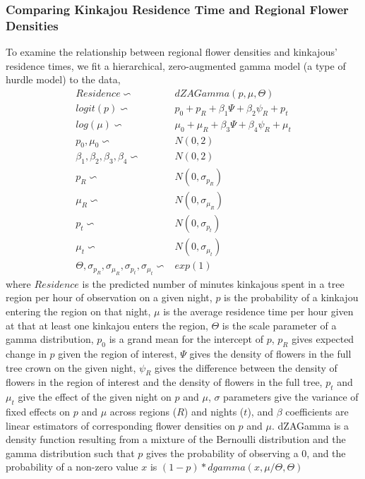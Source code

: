 \documentclass[twoside,12pt,final]{ucthesis-CA2012}
\begin{document}
\begin{ucmainmatter}
\hypertarget{comparing-kinkajou-residence-time-and-regional-flower-densities}{%
\subsubsection{Comparing Kinkajou Residence Time and Regional Flower Densities}\label{comparing-kinkajou-residence-time-and-regional-flower-densities}}

To examine the relationship between regional flower densities and kinkajous' residence times, we fit a hierarchical, zero-augmented gamma model (a type of hurdle model) to the data,
\begin{align*}
Residence \backsim{}& dZAGamma(p, \mu, \Theta) \\
logit(p) \backsim{}& p_0 + p_R + \beta_1 \Psi + \beta_2\psi_R + p_t \\
log(\mu) \backsim{}& \mu_0 + \mu_R + \beta_3 \Psi + \beta_4 \psi_R + \mu_t \\
p_0, \mu_0 \backsim{}& N(0,2) \\
\beta_1, \beta_2, \beta_3, \beta_4 \backsim{}& N(0,2) \\
p_R \backsim{}& N(0, \sigma_{p_R}) \\
\mu_R \backsim{}& N(0, \sigma_{\mu_R}) \\
p_t \backsim{}& N(0, \sigma_{p_t}) \\
\mu_t \backsim{}& N(0, \sigma_{\mu_t}) \\
\Theta, \sigma_{p_R}, \sigma_{\mu_R}, \sigma_{p_t}, \sigma_{\mu_t} \backsim{}& exp(1)
\end{align*}
where \(Residence\) is the predicted number of minutes kinkajous spent in a tree region per hour of observation on a given night, \(p\) is the probability of a kinkajou entering the region on that night, \(\mu\) is the average residence time per hour given at that at least one kinkajou enters the region, \(\Theta\) is the scale parameter of a gamma distribution, \(p_0\) is a grand mean for the intercept of \(p\), \(p_R\) gives expected change in \(p\) given the region of interest, \(\Psi\) gives the density of flowers in the full tree crown on the given night, \(\psi_R\) gives the difference between the density of flowers in the region of interest and the density of flowers in the full tree, \(p_t\) and \(\mu_t\) give the effect of the given night on \(p\) and \(\mu\), \(\sigma\) parameters give the variance of fixed effects on \(p\) and \(\mu\) across regions (\(R\)) and nights (\(t\)), and \(\beta\) coefficients are linear estimators of corresponding flower densities on \(p\) and \(\mu\). dZAGamma is a density function resulting from a mixture of the Bernoulli distribution and the gamma distribution such that \(p\) gives the probability of observing a 0, and the probability of a non-zero value \(x\) is \((1-p)*dgamma(x, \mu/\Theta, \Theta)\)


\end{ucmainmatter}
\end{document}
